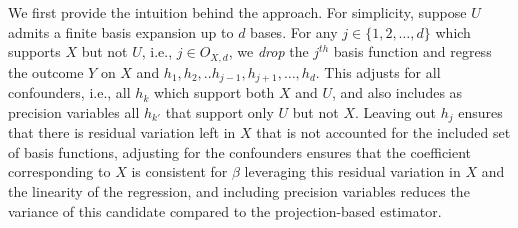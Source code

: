 \documentclass[
  12pt]{article}
\begin{document}
We first provide the intuition behind the approach. For simplicity, suppose $U$ admits a finite basis expansion up to $d$ bases. For any $j \in \{1,2,\ldots,d\}$ which supports $X$ but not $U$, i.e., $j \in O_{X,d}$, we \textit{drop} the $j^{th}$ basis function and regress the outcome $Y$ on $X$ and $h_1,h_2,..h_{j-1},h_{j+1},\ldots,h_d$. This adjusts for all confounders, i.e., all $h_k$ which support both $X$ and $U$, and also includes as precision variables all $h_{k'}$ that support only $U$ but not $X$. Leaving out $h_j$ ensures that there is residual variation left in $X$ that is not accounted for the included set of basis functions, adjusting for the confounders ensures that the coefficient corresponding to $X$ is consistent for $\beta$ leveraging this residual variation in $X$ and the linearity of the regression, and including precision variables reduces the variance of this candidate compared to the projection-based estimator.
\end{document}
